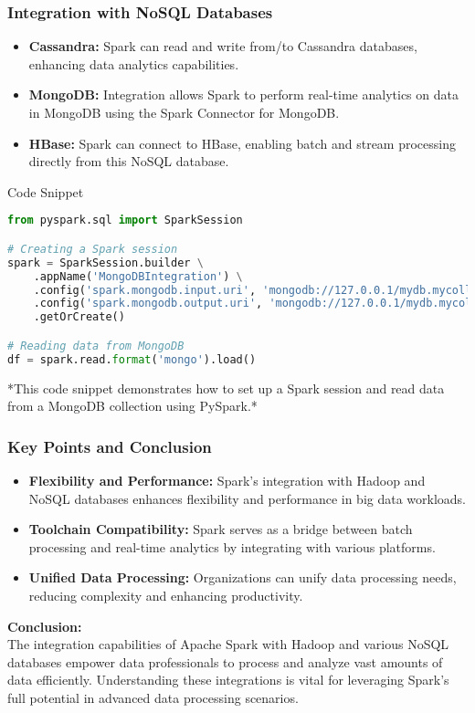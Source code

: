 \documentclass[aspectratio=169]{beamer}
\begin{document}
\begin{frame}[fragile]
    \frametitle{Integration with NoSQL Databases}
    \begin{itemize}
        \item \textbf{Cassandra:} 
        Spark can read and write from/to Cassandra databases, enhancing data analytics capabilities.
        
        \item \textbf{MongoDB:} 
        Integration allows Spark to perform real-time analytics on data in MongoDB using the Spark Connector for MongoDB.
        
        \item \textbf{HBase:} 
        Spark can connect to HBase, enabling batch and stream processing directly from this NoSQL database.
    \end{itemize}
    
    \begin{block}{Code Snippet}
    \begin{lstlisting}[language=python]
from pyspark.sql import SparkSession

# Creating a Spark session
spark = SparkSession.builder \
    .appName('MongoDBIntegration') \
    .config('spark.mongodb.input.uri', 'mongodb://127.0.0.1/mydb.mycollection') \
    .config('spark.mongodb.output.uri', 'mongodb://127.0.0.1/mydb.mycollection') \
    .getOrCreate()

# Reading data from MongoDB
df = spark.read.format('mongo').load()
    \end{lstlisting}
    *This code snippet demonstrates how to set up a Spark session and read data from a MongoDB collection using PySpark.*
    \end{block}
\end{frame}

\begin{frame}[fragile]
    \frametitle{Key Points and Conclusion}
    \begin{itemize}
        \item \textbf{Flexibility and Performance:} 
        Spark's integration with Hadoop and NoSQL databases enhances flexibility and performance in big data workloads.
        
        \item \textbf{Toolchain Compatibility:} 
        Spark serves as a bridge between batch processing and real-time analytics by integrating with various platforms.
        
        \item \textbf{Unified Data Processing:} 
        Organizations can unify data processing needs, reducing complexity and enhancing productivity.
    \end{itemize}
    
    \textbf{Conclusion:} \\
    The integration capabilities of Apache Spark with Hadoop and various NoSQL databases empower data professionals to process and analyze vast amounts of data efficiently. Understanding these integrations is vital for leveraging Spark's full potential in advanced data processing scenarios.
\end{frame}
\end{document}
